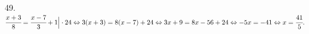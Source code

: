 49. $\cfrac{x+3}{8}=\cfrac{x-7}{3}+1\Big|\cdot24\Leftrightarrow
3(x+3)=8(x-7)+24\Leftrightarrow3x+9=8x-56+24\Leftrightarrow -5x=-41\Leftrightarrow x=\cfrac{41}{5}.$\\
